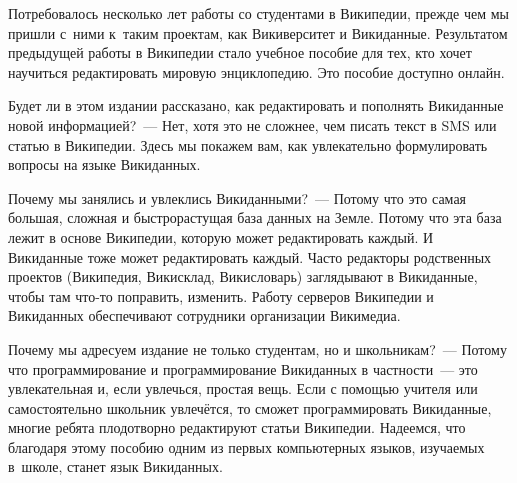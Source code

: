 
Потребовалось несколько лет работы со студентами в Википедии, прежде чем мы пришли с~ними к~таким проектам, 
как Викиверситет и Викиданные. 
Результатом предыдущей работы в Википедии стало учебное пособие для тех, 
кто хочет научиться редактировать мировую энциклопедию. 
Это пособие доступно онлайн. 




Будет ли в этом издании рассказано, 
как редактировать и пополнять Викиданные новой информацией?~--- Нет, 
хотя это не сложнее, чем писать текст в SMS или статью в Википедии. 
Здесь мы покажем вам, как увлекательно формулировать вопросы на языке Викиданных. 


Почему мы занялись и увлеклись Викиданными?~--- Потому что это самая большая, сложная 
и быстрорастущая база данных на Земле. 
Потому что эта база лежит в основе Википедии, которую может редактировать каждый.
И Викиданные тоже может редактировать каждый. 
Часто редакторы родственных проектов (Википедия, Викисклад, Викисловарь) 
заглядывают в Викиданные, чтобы там что-то поправить, изменить. 
Работу серверов Википедии и Викиданных обеспечивают сотрудники организации Викимедиа. 



Почему мы адресуем издание не только студентам, но и школьникам?~--- Потому что 
программирование и программирование Викиданных в частности~--- это 
увлекательная и, если увлечься, простая вещь. 
Если с помощью учителя или самостоятельно школьник увлечётся, 
то сможет программировать Викиданные, 
многие ребята плодотворно редактируют статьи Википедии. 
Надеемся, что благодаря этому пособию одним из первых компьютерных языков, 
изучаемых в~школе, станет язык Викиданных.



